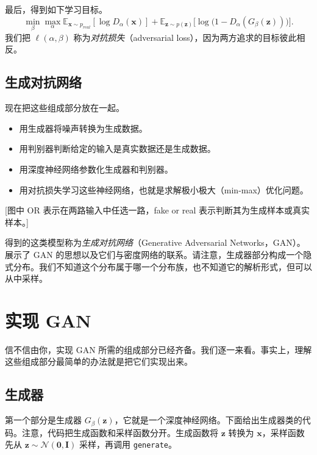 最后，得到如下学习目标。
\begin{equation}
  \min_\beta\max_\alpha
  \mathbb E_{\mathbf x\sim p_{\mathit{real}}}[\log D_\alpha(\mathbf x)]
  +\mathbb E_{\mathbf z\sim p(\mathbf z)}
  \bigl[\log\bigl(1-D_\alpha(G_\beta(\mathbf z))\bigr)\bigr].
  \tag{8.9}\label{eq:08-09}
\end{equation}
我们把 $\ell(\alpha,\beta)$ 称为\emph{对抗损失}（adversarial loss），因为两方追求的目标彼此相反。

\subsection{生成对抗网络}

现在把这些组成部分放在一起。
\begin{itemize}
  \item 用生成器将噪声转换为生成数据。
  \item 用判别器判断给定的输入是真实数据还是生成数据。
  \item 用深度神经网络参数化生成器和判别器。
  \item 用对抗损失学习这些神经网络，也就是求解极小极大（min-max）优化问题。
\end{itemize}

[图中 OR 表示在两路输入中任选一路，fake or real 表示判断其为生成样本或真实样本。]

得到的这类模型称为\emph{生成对抗网络}（Generative Adversarial Networks，GAN）。 展示了 GAN 的思想以及它们与密度网络的联系。请注意，生成器部分构成一个隐式分布。我们不知道这个分布属于哪一个分布族，也不知道它的解析形式，但可以从中采样。

\section{实现 GAN}
\label{sec:08-03}

信不信由你，实现 GAN 所需的组成部分已经齐备。我们逐一来看。事实上，理解这些组成部分最简单的办法就是把它们实现出来。

\subsection{生成器}

第一个部分是生成器 $G_\beta(\mathbf z)$，它就是一个深度神经网络。下面给出生成器类的代码。注意，代码把生成函数和采样函数分开。生成函数将 $\mathbf z$ 转换为 $\mathbf x$，采样函数先从 $\mathbf z\sim\mathcal N(\mathbf 0,\mathbf I)$ 采样，再调用 \texttt{generate}。

